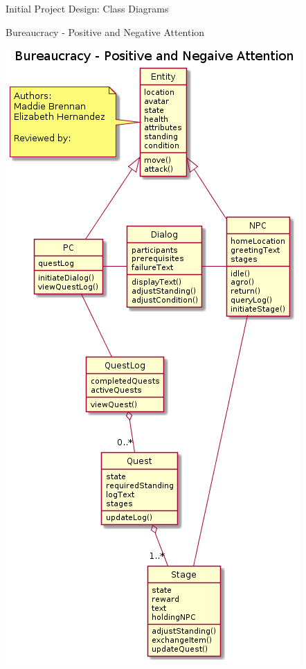 \documentclass[12pt]{report}
\begin{document}
\begin{chapter}{Initial Project Design: Class Diagrams}
\begin{section}{Bureaucracy - Positive and Negative Attention}
    	\centerline{\includegraphics[width=\textwidth,height=\textheight,keepaspectratio]{./images/Class_Diagram.png}}


\end{section}
\end{chapter}
\end{document}
